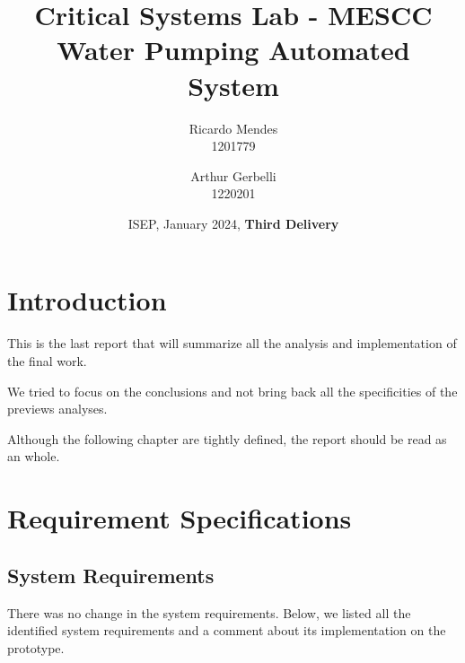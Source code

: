 \documentclass[11pt]{article}
\title{\textbf{Critical Systems Lab - MESCC\\ Water Pumping Automated System}}
\date{ISEP, January 2024, \textbf{Third Delivery}}
\author{Ricardo Mendes\\ 1201779
\and Arthur Gerbelli\\ 1220201}
\begin{document}
\maketitle              
\newpage
\tableofcontents
\newpage

%
\section{Introduction}

This is the last report that will summarize all the analysis and implementation of the final work.

We tried to focus on the conclusions and not bring back all the specificities of the previews analyses. 

Although the following chapter are tightly defined, the report should be read as an whole. 

\section{Requirement Specifications}

\subsection{System Requirements}

There was no change in the system requirements. Below, we listed all the identified system requirements and a comment about its implementation on the prototype. 
\end{document}
